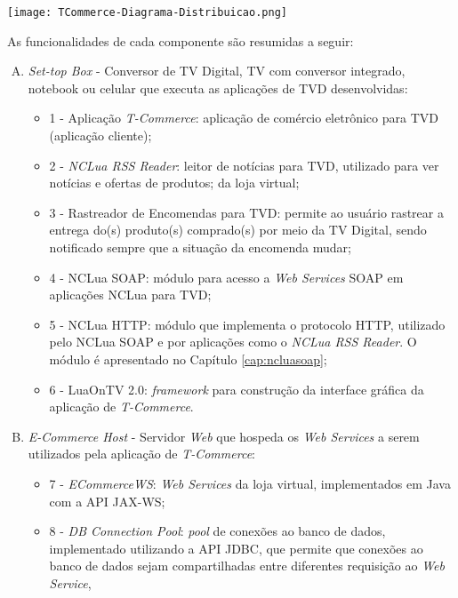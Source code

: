 \begin{center}
	\texttt{[image: TCommerce-Diagrama-Distribuicao.png]}
	\label{fig:diag-distribuicao}
\end{center}

As funcionalidades de cada componente são resumidas a seguir:

\begin{enumerate}[A)]
	\item \textit{Set-top Box} - Conversor de TV Digital, TV com conversor integrado, notebook ou celular que executa as aplicações de TVD desenvolvidas:
	\begin{itemize}
		\item 1 - Aplicação \textit{T-Commerce}: aplicação de comércio eletrônico para TVD (aplicação cliente);
		\item 2 - \textit{NCLua RSS Reader}: leitor de notícias para TVD, utilizado para ver notícias e ofertas de produtos;
		      da loja virtual;
		\item 3 - Rastreador de Encomendas para TVD: permite ao usuário rastrear a entrega do(s) produto(s) comprado(s) por meio da TV Digital,
		sendo notificado sempre que a situação da encomenda mudar;
		\item 4 - NCLua SOAP: módulo para acesso a \textit{Web Services} SOAP em aplicações NCLua para TVD;
		\item 5 - NCLua HTTP: módulo que implementa o protocolo HTTP, utilizado pelo NCLua SOAP e por aplicações
		          como o \textit{NCLua RSS Reader}. O módulo é apresentado no Capítulo \ref{cap:ncluasoap};
		\item 6 - LuaOnTV 2.0: \textit{framework} para construção da interface gráfica da aplicação de \textit{T-Commerce}.
	\end{itemize}
	\item \textit{E-Commerce Host} - Servidor \textit{Web} que hospeda os \textit{Web Services} a serem utilizados pela aplicação de \textit{T-Commerce}:
	\begin{itemize}
		\item 7 - \textit{ECommerceWS}: \textit{Web Services} da loja virtual, implementados em Java com a API JAX-WS;
		\item 8 - \textit{DB Connection Pool}: \textit{pool} de conexões ao banco de dados, implementado utilizando a API JDBC,
		que permite que conexões ao banco de dados sejam compartilhadas entre diferentes requisição ao \textit{Web Service},

\end{itemize}
\end{enumerate}
